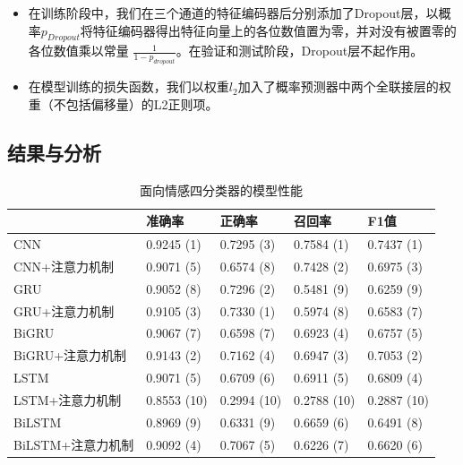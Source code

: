 \begin{itemize}
\item 在训练阶段中，我们在三个通道的特征编码器后分别添加了Dropout层，以概率$p_{Dropout}$将特征编码器得出特征向量上的各位数值置为零，并对没有被置零的各位数值乘以常量 $\frac{1}{1-p_{dropout}}$。在验证和测试阶段，Dropout层不起作用。

\item 在模型训练的损失函数，我们以权重$l_2$加入了概率预测器中两个全联接层的权重（不包括偏移量）的L2正则项。


\end{itemize}

\subsection{结果与分析}

\begin{table}[htb]
  \centering
  \begin{minipage}[t]{\linewidth}
  \caption{面向情感四分类器的模型性能}
  \label{tab:exp_context_emo_0_result}
    \begin{tabularx}{\linewidth}{X|llll}
    \toprule[1.5pt]
    & 准确率 & 正确率 & 召回率 & F1值 \\
    \hline
    CNN & 0.9245 (1) & 0.7295 (3) & 0.7584 (1) & 0.7437 (1) \\ %
    CNN+注意力机制 & 0.9071 (5) & 0.6574 (8) & 0.7428 (2) & 0.6975 (3) \\ %
    \hline
    GRU & 0.9052 (8) & 0.7296 (2) & 0.5481 (9) & 0.6259 (9) \\ %
    GRU+注意力机制 & 0.9105 (3) & 0.7330 (1) & 0.5974 (8) & 0.6583 (7) \\ %
    \hline
    BiGRU & 0.9067 (7) & 0.6598 (7) & 0.6923 (4) & 0.6757 (5) \\ %
    BiGRU+注意力机制 & 0.9143 (2) & 0.7162 (4) & 0.6947 (3) & 0.7053 (2) \\ %
    \hline
    LSTM & 0.9071 (5) & 0.6709 (6) & 0.6911 (5) & 0.6809 (4) \\ %
    LSTM+注意力机制 & 0.8553 (10) & 0.2994 (10) & 0.2788 (10) & 0.2887 (10) \\ %
    \hline
    BiLSTM & 0.8969 (9) & 0.6331 (9) & 0.6659 (6) & 0.6491 (8) \\ %
    BiLSTM+注意力机制 & 0.9092 (4) & 0.7067 (5) & 0.6226 (7) & 0.6620 (6) \\ %
    \bottomrule[1.5pt]
    \end{tabularx}
  \end{minipage}
\end{table}


